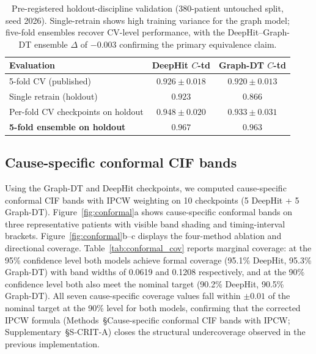 \documentclass[11pt]{article}
\begin{document}
\begin{table}[!t]
\centering
\caption{Pre-registered holdout-discipline validation (380-patient untouched split, seed 2026). Single-retrain shows high training variance for the graph model; five-fold ensembles recover CV-level performance, with the DeepHit--Graph-DT ensemble $\Delta$ of $-0.003$ confirming the primary equivalence claim.}
\label{tab:holdout_validation}
\begin{tabular}{lcc}
\toprule
Evaluation & DeepHit $C$-td & Graph-DT $C$-td \\
\midrule
5-fold CV (published) & $0.926 \pm 0.018$ & $0.920 \pm 0.013$ \\
Single retrain (holdout) & $0.923$ & $0.866$ \\
Per-fold CV checkpoints on holdout & $0.948 \pm 0.020$ & $0.933 \pm 0.031$ \\
\textbf{5-fold ensemble on holdout} & $\mathbf{0.967}$ & $\mathbf{0.963}$ \\
\bottomrule
\end{tabular}
\end{table}

\subsection*{Cause-specific conformal CIF bands}

Using the Graph-DT and DeepHit checkpoints, we computed cause-specific conformal CIF bands with IPCW weighting on 10 checkpoints (5 DeepHit + 5 Graph-DT). Figure~\ref{fig:conformal}a shows cause-specific conformal bands on three representative patients with visible band shading and timing-interval brackets. Figure~\ref{fig:conformal}b--c displays the four-method ablation and directional coverage. Table~\ref{tab:conformal_cov} reports marginal coverage: at the 95\% confidence level both models achieve formal coverage (95.1\% DeepHit, 95.3\% Graph-DT) with band widths of 0.0619 and 0.1208 respectively, and at the 90\% confidence level both also meet the nominal target (90.2\% DeepHit, 90.5\% Graph-DT). All seven cause-specific coverage values fall within $\pm 0.01$ of the nominal target at the 90\% level for both models, confirming that the corrected IPCW formula (Methods~\S Cause-specific conformal CIF bands with IPCW; Supplementary~\S S-CRIT-A) closes the structural undercoverage observed in the previous implementation.
\end{document}
